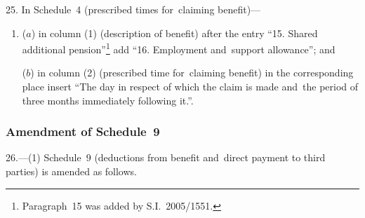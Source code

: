 \documentclass[12pt,a4paper]{article}
\begin{document}
25.  In Schedule~4 (prescribed times for~claiming benefit)—
\begin{enumerate}\item[]
($a$) in column (1) (description of benefit) after the entry “15. Shared additional pension”\footnote{Paragraph~15 was added by S.I.~2005/1551.} add “16. Employment and~support allowance”; and

($b$) in column (2) (prescribed time for~claiming benefit) in the corresponding place insert “The day in respect of which the claim is made and~the period of three months immediately following it.”.
\end{enumerate}

\subsubsection[26. Amendment of Schedule~9]{Amendment of Schedule~9}

26.---(1)  Schedule~9 (deductions from benefit and~direct payment to third parties) is amended as follows.
\end{document}
